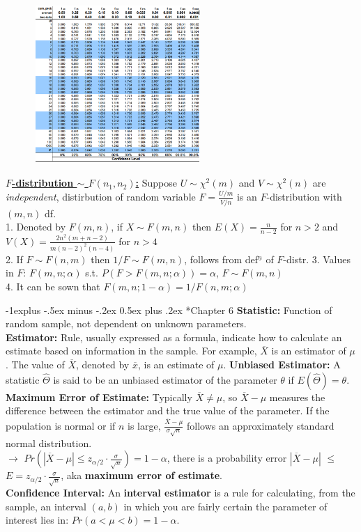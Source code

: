 \documentclass[10pt,landscape]{article}
\makeatletter
\renewcommand{\subsection}{\@startsection{subsection}{2}{0mm}%
                                {-1explus -.5ex minus -.2ex}%
                                {0.5ex plus .2ex}%
                                {\normalfont\normalsize\bfseries}}
\makeatother
\begin{document}
\begin{multicols*}{3}
\includegraphics*[width=8.5cm, height=6cm]{ttable.png}

\textbf{\underline{$F$-distribution $\sim$ $F(n_1,n_2)$:}} Suppose $U \sim \chi^2(m)$ and $V \sim \chi^2(n)$ are \textit{independent}, distirbution of random variable $F = \frac{U/m}{V/n}$ is an $F$-distribution with $(m, n)$ df. \\ 
1. Denoted by $F(m,n)$, if $X \sim F(m,n)$ then $E(X) = \frac{n}{n-2}$ for $n>2$ and $V(X) = \frac{2n^2(m+n-2)}{m(n-2)^2(n-4)}$ for $n>4$ \\ 
2. If $F \sim F(n,m)$ then $1/F \sim F(m,n)$, follows from def$^{\underline{n}}$ of $F$-distr.
3. Values in $F$: $F(m,n;\alpha)$ s.t. $P(F> F(m,n;\alpha)) = \alpha$, $F\sim F(m,n)$ \\ 
4. It can be sown that $F(m,n;1-\alpha) = 1/F(n,m;\alpha)$

\subsection*{Chapter 6}
\textbf{Statistic:} Function of random sample, not dependent on unknown parameters.  \\ 
\textbf{Estimator:} Rule, usually expressed as a formula, indicate how to calculate an estimate based on information in the sample.
For example, $\overline{X}$ is an estimator of $\mu$. The value of $\overline{X}$, denoted by $\overline{x}$, is an estimate of $\mu$.
\textbf{Unbiased Estimator:} A statistic $\widehat{\Theta}$ is said to be an unbiased estimator of the parameter $\theta$ if $E(\widehat{\Theta})=\theta$. \\ 
\textbf{Maximum Error of Estimate:} Typically $\overline{X} \neq \mu$, so $\overline{X} - \mu$ measures the difference between the estimator and
the true value of the parameter. If the population is normal or if $n$ is large, $\frac{\overline{X}-\mu}{\sigma\sqrt{n}}$
follows an approximately standard normal distribution. \\ $\rightarrow$ $Pr(\left|\overline{X} - \mu\right| \leq z_{\alpha/2} \cdot  \frac{\sigma}{\sqrt{n}}) = 1 - \alpha$, there is a probability error $\left|\overline{X} - \mu\right|$ $\leq$ $E = z_{\alpha/2} \cdot  \frac{\sigma}{\sqrt{n}}$, aka \textbf{maximum error of estimate}. \\ 
\textbf{Confidence Interval:} An \textbf{interval estimator} is a rule for calculating, from the sample, an interval
$(a,b)$ in which you are fairly certain the parameter of interest lies in: $Pr(a < \mu < b) = 1 - \alpha$. \\ 


\end{multicols*}
\end{document}
